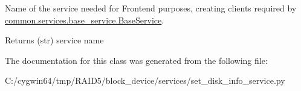 Name of the service needed for Frontend purposes, creating clients required by \hyperlink{class_r_a_i_d5_1_1common_1_1services_1_1base__service_1_1_base_service}{common.\+services.\+base\+\_\+service.\+Base\+Service}. 

\begin{DoxyReturn}{Returns}
(str) service name 
\end{DoxyReturn}


The documentation for this class was generated from the following file\+:\begin{DoxyCompactItemize}
\item 
C\+:/cygwin64/tmp/\+R\+A\+I\+D5/block\+\_\+device/services/set\+\_\+disk\+\_\+info\+\_\+service.\+py\end{DoxyCompactItemize}
